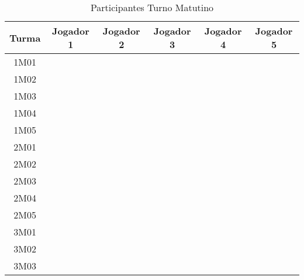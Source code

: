 \documentclass[10pt]{article}
\begin{document}
    \begin{table}[h!]
        \caption{Participantes Turno Matutino}
        \label{tab:part-matutino}
        \begin{center}
            \begin{tabular}{c|c|c|c|c|c}
                \hline
                \textbf{Turma} & \textbf{Jogador 1} & \textbf{Jogador 2} & \textbf{Jogador 3} & \textbf{Jogador 4} & \textbf{Jogador 5}\\ \hline
                1M01 & & & & & \\ \hline
                1M02 & & & & & \\ \hline
                1M03 & & & & & \\ \hline
                1M04 & & & & & \\ \hline
                1M05 & & & & & \\ \hline
                2M01 & & & & & \\ \hline
                2M02 & & & & & \\ \hline
                2M03 & & & & & \\ \hline
                2M04 & & & & & \\ \hline
                2M05 & & & & & \\ \hline
                3M01 & & & & & \\ \hline
                3M02 & & & & & \\ \hline
                3M03 & & & & & \\ \hline
            \end{tabular}
        \end{center}
    \end{table}

    \pagebreak
\end{document}
